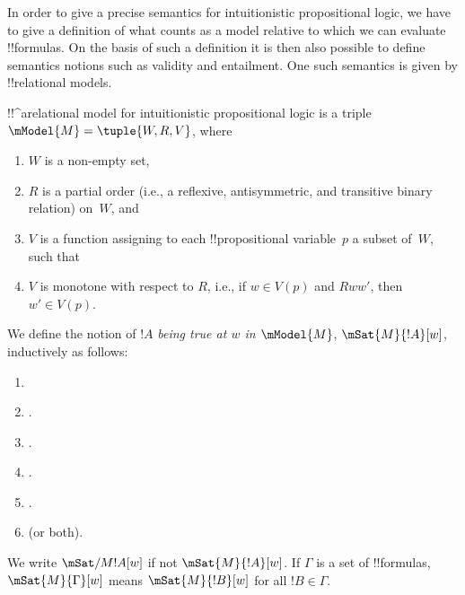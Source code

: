 \documentclass[../../../include/open-logic-section]{subfiles}
\begin{document}


In order to give a precise semantics for intuitionistic propositional
logic, we have to give a definition of what counts as a model relative
to which we can evaluate !!{formula}s. On the basis of such a
definition it is then also possible to define semantics notions such
as validity and entailment. One such semantics is given by
!!{relational model}s.

\begin{defn}
  !!^a{relational model} for intuitionistic propositional logic is a
  triple $\mModel{M} = \tuple{W, R, V}$, where
  \begin{enumerate}
  \item $W$ is a non-empty set,
  \item $R$ is a partial order (i.e., a reflexive, antisymmetric, and transitive binary relation) on~$W$, and
  \item $V$ is a function assigning to each !!{propositional
    variable}~$p$ a subset of~$W$, such that
  \item $V$ is monotone with respect to $R$, i.e., if $w
    \in V(p)$ and $Rww'$, then $w' \in V(p)$.
  \end{enumerate}
\end{defn}

\begin{defn}
  We define the notion of $!A$ \emph{being true at $w$ in
    $\mModel{M}$}, $\mSat{M}{!A}[w]$, inductively as follows:
  \begin{enumerate}
  \item {}
  \item {}.
  \item {}.
  \item {}.
  \item {}.
  \item {} (or both).
  \end{enumerate}
  We write $\mSat/{M}{!A}[w]$ if not $\mSat{M}{!A}[w]$. If $\Gamma$ is
  a set of !!{formula}s, $\mSat{M}{\Gamma}[w]$ means $\mSat{M}{!B}[w]$
  for all $!B \in \Gamma$.
\end{defn}
\end{document}
